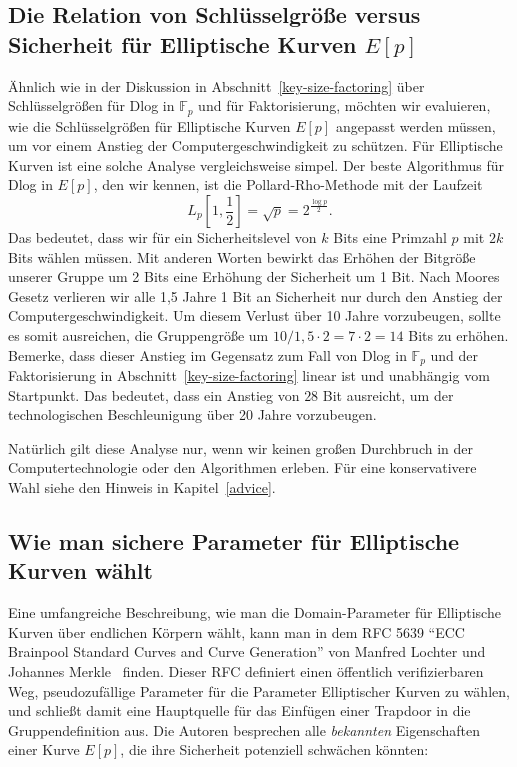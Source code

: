 \begin{refsegment}
\subsection{\texorpdfstring{Die Relation von Schlüsselgröße versus Sicherheit für Elliptische Kurven $E[p]$}{Die Relation von Schlüsselgröße versus Sicherheit für Elliptische Kurven E[p]}}
\label{key-size-EC}

Ähnlich wie in der Diskussion in Abschnitt~\ref{key-size-factoring} über Schlüsselgrößen für Dlog in $\mathbb{F}_p$ und für Faktorisierung, möchten wir evaluieren, wie die Schlüsselgrößen für Elliptische Kurven $E[p]$ angepasst werden müssen, um vor einem Anstieg der Computergeschwindigkeit zu schützen. Für Elliptische Kurven ist eine solche Analyse vergleichsweise simpel. Der beste Algorithmus für Dlog in $E[p]$, den wir kennen, ist die Pollard-Rho-Methode mit der Laufzeit
$$
  L_p[1,\frac 1 2] = \sqrt{p} = 2^{\frac{ \log p}{2}}.
$$
Das bedeutet, dass wir für ein Sicherheitslevel von $k$ Bits eine Primzahl $p$ mit $2k$ Bits wählen müssen. Mit anderen Worten bewirkt das Erhöhen der Bitgröße unserer Gruppe um 2 Bits eine Erhöhung der Sicherheit um 1 Bit. Nach Moores Gesetz verlieren wir alle 1,5 Jahre 1 Bit an Sicherheit nur durch den Anstieg der Computergeschwindigkeit. Um diesem Verlust über 10 Jahre vorzubeugen, sollte es somit ausreichen, die Gruppengröße um $10 / 1,5 \cdot 2 = 7 \cdot 2=14$ Bits zu erhöhen. Bemerke, dass dieser Anstieg im Gegensatz zum Fall von Dlog in $\mathbb{F}_p$ und der Faktorisierung in Abschnitt~\ref{key-size-factoring} linear ist und unabhängig vom Startpunkt. Das bedeutet, dass ein Anstieg von $28$ Bit ausreicht, um der technologischen Beschleunigung über 20 Jahre vorzubeugen.

Natürlich gilt diese Analyse nur, wenn wir keinen großen Durchbruch in der Computertechnologie oder den Algorithmen erleben. Für eine konservativere Wahl siehe den Hinweis in Kapitel~\ref{advice}.


\subsection{Wie man sichere Parameter für Elliptische Kurven wählt}

Eine umfangreiche Beschreibung, wie man die Domain-Parameter für Elliptische Kurven über endlichen Körpern wählt, kann man in dem RFC 5639 ``ECC Brainpool Standard Curves and Curve Generation'' von Manfred Lochter und Johannes Merkle~\cite{LM2010, LM2005} finden. Dieser RFC definiert einen öffentlich verifizierbaren Weg, pseudozufällige Parameter für die Parameter Elliptischer Kurven zu wählen, und schließt damit eine Hauptquelle für das Einfügen einer Trapdoor in die Gruppendefinition aus. Die Autoren besprechen alle {\em bekannten} Eigenschaften einer Kurve $E[p]$, die ihre Sicherheit potenziell schwächen könnten:


\end{refsegment}
